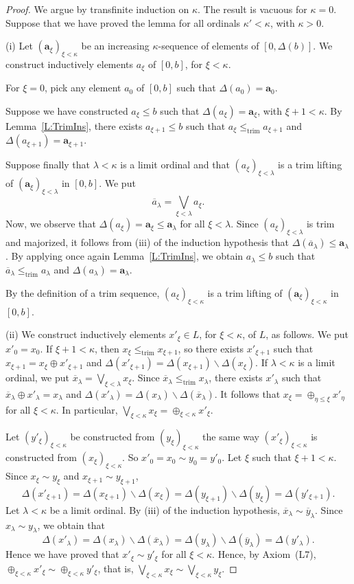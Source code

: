 \documentclass[psamsfonts,reqno]{memo-l}
\theoremstyle{plain}
\theoremstyle{definition}
\theoremstyle{remark}
\numberwithin{equation}{section}
\newcommand{\oll}[1]{\overline{#1}}
\newcommand{\trim}{\leq_{\mathrm{trim}}}
\newcommand{\sd}{\smallsetminus}
\newcommand{\la}{\boldsymbol{a}}
\newcommand{\DD}{\Delta}
\newcommand{\famm}[2]{(#1)_{#2}}
\begin{document}
\begin{proof}
We argue by transfinite induction on $\kappa$. The result is vacuous  for
$\kappa=0$. Suppose that we have proved the lemma for all ordinals
$\kappa'<\kappa$, with $\kappa>0$.

(i) Let $\famm{\la_\xi}{\xi<\kappa}$ be an increasing $\kappa$-sequence of
elements of $[0,\DD(b)]$.
We construct inductively elements $a_\xi$ of $[0,b]$, for $\xi<\kappa$.

For $\xi=0$, pick any element $a_0$ of $[0,b]$ such that $\DD(a_0)=\la_0$.

Suppose we have constructed $a_\xi\leq b$ such that $\DD(a_\xi)=\la_\xi$,
with $\xi+1<\kappa$. By Lemma~\ref{L:TrimIns}, there exists
$a_{\xi+1}\leq b$ such that $a_\xi\trim a_{\xi+1}$ and
$\DD(a_{\xi+1})=\la_{\xi+1}$.

Suppose finally that $\lambda<\kappa$ is a limit ordinal and that
$\famm{a_\xi}{\xi<\lambda}$ is a trim lifting of
$\famm{\la_\xi}{\xi<\lambda}$ in $[0,b]$. We put
   \[
   \oll{a}_\lambda=\bigvee_{\xi<\lambda}a_\xi.
   \]
Now, we observe that $\DD(a_\xi)=\la_\xi\leq\la_\lambda$ for all
$\xi<\lambda$. Since $\famm{a_\xi}{\xi<\lambda}$ is trim and majorized, it
follows from (iii) of the induction hypothesis that
$\DD(\oll{a}_\lambda)\leq\la_\lambda$. By applying once again
Lemma~\ref{L:TrimIns}, we obtain $a_\lambda\leq b$ such that
$\oll{a}_\lambda\trim a_\lambda$ and
$\DD(a_\lambda)=\la_\lambda$.

By the definition of a trim sequence, $\famm{a_\xi}{\xi<\kappa}$ is a trim
lifting of $\famm{\la_\xi}{\xi<\kappa}$ in $[0,b]$.\smallskip

(ii) We construct inductively elements $x'_\xi\in L$, for $\xi<\kappa$, of
$L$, as follows. We put $x'_0=x_0$. If $\xi+1<\kappa$, then
$x_\xi\trim x_{\xi+1}$, so there exists $x'_{\xi+1}$ such that
$x_{\xi+1}=x_\xi\oplus x'_{\xi+1}$ and
$\DD(x'_{\xi+1})=\DD(x_{\xi+1})\sd\DD(x_\xi)$.
If $\lambda<\kappa$ is a limit ordinal, we put
$\oll{x}_\lambda=\bigvee_{\xi<\lambda}x_\xi$. Since
$\oll{x}_\lambda\trim x_\lambda$, there exists $x'_\lambda$ such that
$\oll{x}_\lambda\oplus x'_\lambda=x_\lambda$ and
$\DD(x'_\lambda)=\DD(x_\lambda)\sd\DD(\oll{x}_\lambda)$.
It follows that $x_\xi=\oplus_{\eta\leq\xi}x'_\eta$ for all $\xi<\kappa$.
In particular, $\bigvee_{\xi<\kappa}x_\xi=\oplus_{\xi<\kappa}x'_\xi$.

Let $\famm{y'_\xi}{\xi<\kappa}$ be constructed from
$\famm{y_\xi}{\xi<\kappa}$ the same way $\famm{x'_\xi}{\xi<\kappa}$ is
constructed from $\famm{x_\xi}{\xi<\kappa}$. So $x'_0=x_0\sim y_0=y'_0$.
Let $\xi$ such that $\xi+1<\kappa$. Since $x_\xi\sim y_\xi$ and
$x_{\xi+1}\sim y_{\xi+1}$,
   \[
   \DD(x'_{\xi+1})=\DD(x_{\xi+1})\sd\DD(x_\xi)=\DD(y_{\xi+1})\sd\DD(y_\xi)
   =\DD(y'_{\xi+1}).
   \]
Let $\lambda<\kappa$ be a limit ordinal. By (iii) of the induction
hypothesis, $\oll{x}_\lambda\sim\oll{y}_\lambda$. Since
$x_\lambda\sim y_\lambda$, we obtain that
   \[
   \DD(x'_\lambda)=\DD(x_\lambda)\sd\DD(\oll{x}_\lambda)=
   \DD(y_\lambda)\sd\DD(\oll{y}_\lambda)=\DD(y'_\lambda).
   \]
Hence we have proved that $x'_\xi\sim y'_\xi$ for all $\xi<\kappa$. Hence,
by Axiom~(L7), $\oplus_{\xi<\kappa}x'_\xi\sim\oplus_{\xi<\kappa}y'_\xi$,
that is, $\bigvee_{\xi<\kappa}x_\xi\sim\bigvee_{\xi<\kappa}y_\xi$.
\smallskip


\end{proof}
\end{document}

